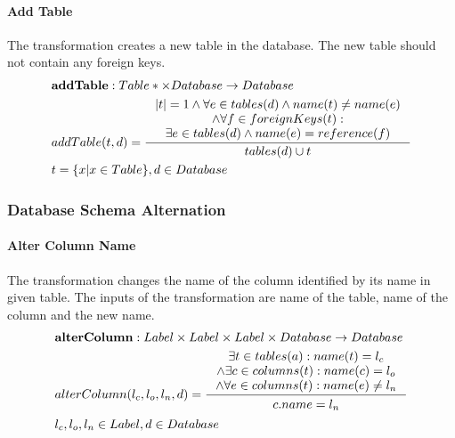 \documentclass[11pt]{article}
\begin{document}
\paragraph{Add Table} The transformation creates a new table in the database. The new table should not contain any foreign keys.
\begin{align*}
&	\mathbf{addTable} : Table* \times Database \rightarrow Database \\ 
&	addTable(t, d) =
		\inference{|t| = 1 \wedge \forall e \in tables(d) \wedge name(t) \neq name(e) \\ \wedge \forall f \in foreignKeys(t) : \\ \exists e \in tables(d) \wedge name(e) = reference(f) }{tables(d) \cup t}
	 \\ 
&	t = \{x | x \in Table\}, d \in Database
\end{align*}


\subsubsection{Database Schema Alternation}
\paragraph{Alter Column Name} The transformation changes the name of the column identified by its name in given table. The inputs of the transformation are name of the table, name of the column and the new name. 
\begin{align*}
& \mathbf{alterColumn} : Label \times Label \times Label \times Database \rightarrow Database \\
&	alterColumn(l_c, l_o, l_n, d) =
 \inference{\exists t \in tables(a) : name(t) = l_c \\ \wedge \exists c \in columns(t) : name(c) = l_o \\ \wedge \forall e \in columns(t) : name(e) \neq l_n}{\begin{gathered}
c.name = l_n 
\end{gathered}}
 \\
& l_c, l_o, l_n \in Label, d \in Database
\end{align*}
\end{document}

